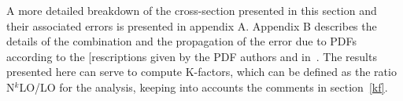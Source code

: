 A more detailed breakdown of the cross-section presented in this section and their 
associated errors is presented in appendix A.
Appendix B describes the details of the combination and the propagation of the
error due to PDFs according to the [rescriptions given by the PDF authors and
in~\cite{pdf4lhc}.
The results presented 
here can serve to compute K-factors, which can be defined as the ratio 
N$^k$LO/LO for the analysis, keeping into accounts the comments in section~\ref{kf}.









